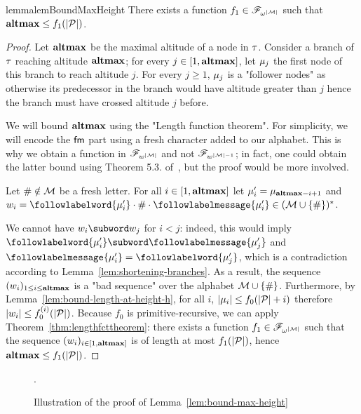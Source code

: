 \begin{restatable}{lemma}{lemBoundMaxHeight}
	\label{lem:bound-max-height}
	There exists a function $f_1 \in \mathscr{F}_{\omega^{|\mathcal{M}|}}$ such that $\mathbf{altmax} \leq f_1(|\mathcal{P}|)$.
\end{restatable}
\begin{proof}
	Let $\mathbf{altmax}$ be the maximal altitude of a node in $\tau$. Consider a branch of $\tau$ reaching altitude $\mathbf{altmax}$; for every $j \in [1,\mathbf{altmax}]$, let $\mu_j$ the first node of this branch to reach altitude $j$. For every $j \geq 1$, $\mu_j$ is a "follower nodes" as otherwise its predecessor in the branch would have altitude greater than $j$ hence the branch must have crossed altitude $j$ before.
	
	We will bound $\mathbf{altmax}$ using the "Length function theorem". For simplicity, we will encode the $\mathsf{fm}$ part using a fresh character added to our alphabet. This is why we obtain a function in $\mathscr{F}_{w^{|\mathcal{M}|}}$ and not $\mathscr{F}_{w^{|\mathcal{M}|-1}}$; in fact, one could obtain the latter bound using Theorem 5.3. of~\cite{SchmitzS2011upperHigman}, but the proof would be more involved.

	Let $\# \notin \mathcal{M}$ be a fresh letter. For all $i \in [1,\mathbf{altmax}]$ let $\mu'_i = \mu_{\mathbf{altmax} - i+1}$ and $w_i = \followlabelword{\node'_{i}} \cdot \# \cdot \followlabelmessage{\node'_{i}} \in (\messages \cup \set{\#})^*$.
	
	We cannot have $w_{i}\subword w_{j}$ for $i< j$: indeed, this would imply $\followlabelword{\node'_{i}} \subword \followlabelmessage{\node'_{j}}$ and $\followlabelmessage{\node'_{i}} = \followlabelword{\node'_{j}}$, which is a contradiction according to Lemma~\ref{lem:shortening-branches}.
	As a result, the sequence $(w_i)_{1\leq i \leq \mathbf{altmax}}$ is a "bad sequence" over the alphabet $\mathcal{M}\cup\{\#\}$.
	Furthermore, by Lemma~\ref{lem:bound-length-at-height-h}, for all $i$, $|\mu_{i}| \leq f_0(|\mathcal{P}| + i)$ therefore $|w_i| \leq f_0^{(i)}(|\mathcal{P}|)$.
	Because $f_0$ is primitive-recursive, we can apply Theorem~\ref{thm:lengthfcttheorem}: there exists a function $f_1 \in \mathscr{F}_{\omega^{|\mathcal{M}|}}$ such that the sequence $(w_i)_{i \in [1,\mathbf{altmax}]}$ is of length at most $f_1(|\mathcal{P}|)$, hence $\mathbf{altmax} \leq f_1(|\mathcal{P}|)$. 
\end{proof}
\begin{figure}[h]
	
	\caption{Illustration of the proof of Lemma~\ref{lem:bound-max-height}}.
	\label{fig:max-height-bound}
\end{figure}

